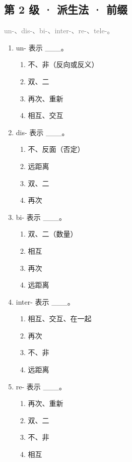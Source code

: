 \documentclass[11pt,a4paper]{ctexart}
\begin{document}
\subsection*{第 2 级 · 派生法 · 前缀}
\noindent\textcolor{gray}{un-、dis-、bi-、inter-、re-、tele-。}\par\smallskip
\begin{enumerate}[leftmargin=*,itemsep=4pt]
\item un- 表示 \_\_\_。
\begin{enumerate}[label=\Alph*.,leftmargin=2em,itemsep=1pt,topsep=2pt]
\item 不、非（反向或反义）
\item 双、二
\item 再次、重新
\item 相互、交互
\end{enumerate}
\item dis- 表示 \_\_\_。
\begin{enumerate}[label=\Alph*.,leftmargin=2em,itemsep=1pt,topsep=2pt]
\item 不、反面（否定）
\item 远距离
\item 双、二
\item 再次
\end{enumerate}
\item bi- 表示 \_\_\_。
\begin{enumerate}[label=\Alph*.,leftmargin=2em,itemsep=1pt,topsep=2pt]
\item 双、二（数量）
\item 相互
\item 再次
\item 远距离
\end{enumerate}
\item inter- 表示 \_\_\_。
\begin{enumerate}[label=\Alph*.,leftmargin=2em,itemsep=1pt,topsep=2pt]
\item 相互、交互、在一起
\item 再次
\item 不、非
\item 远距离
\end{enumerate}
\item re- 表示 \_\_\_。
\begin{enumerate}[label=\Alph*.,leftmargin=2em,itemsep=1pt,topsep=2pt]
\item 再次、重新
\item 双、二
\item 不、非
\item 相互

\end{enumerate}
\end{enumerate}
\end{document}
